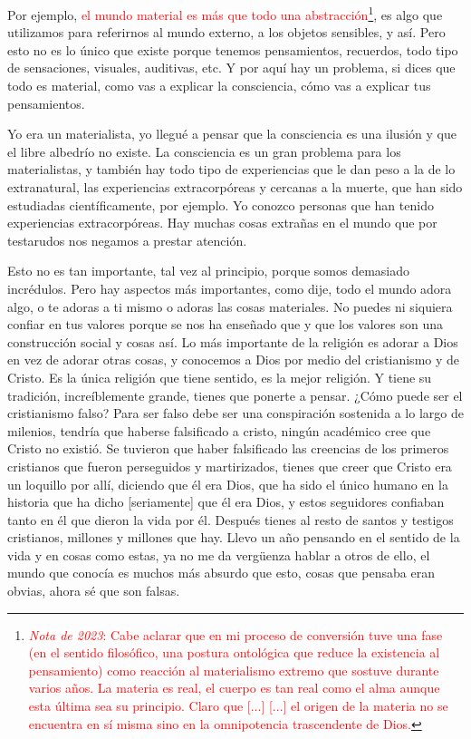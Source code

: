 \documentclass[12pt]{article}
\begin{document}
	Por ejemplo, \textcolor{red}{el mundo material es más que todo una
	abstracción}\footnote{\textcolor{red}{\textit{Nota de 2023}: Cabe
	aclarar que en mi proceso de conversión tuve una fase
	 (en el sentido filosófico, una postura ontológica
	que reduce la existencia al pensamiento)
	como reacción al materialismo extremo que sostuve durante varios años.
	La materia es real, el cuerpo es tan real como el alma aunque esta
	última sea su principio. Claro que [...]\newline} \textcolor{red}{[...]
	el origen de la materia no se encuentra en sí misma sino en la
	omnipotencia trascendente de Dios.}}, es
	algo que utilizamos para referirnos al mundo externo, a los objetos
	sensibles, y así. Pero esto no es lo único que existe porque tenemos
	pensamientos, recuerdos, todo tipo de sensaciones, visuales, auditivas,
	etc. Y por aquí hay un problema, si dices que todo es material, como vas
	a explicar la consciencia, cómo vas a explicar tus pensamientos.

	Yo era un materialista, yo llegué a pensar que la consciencia es una
	ilusión y que el libre albedrío no existe. La consciencia es un gran
	problema para los materialistas, y también hay todo tipo de experiencias
	que le dan peso a la  de lo extranatural, las
	experiencias extracorpóreas y cercanas a la muerte, que han sido
	estudiadas científicamente, por ejemplo. Yo conozco personas que han
	tenido experiencias extracorpóreas. Hay muchas cosas extrañas en el
	mundo que por testarudos nos negamos a prestar atención.

	Esto no es tan importante, tal vez al principio, porque somos
	demasiado incrédulos. Pero hay aspectos más importantes, como dije, todo
	el mundo adora algo, o te adoras a ti mismo o adoras las cosas
	materiales. No puedes ni siquiera confiar en tus valores porque se nos
	ha enseñado que  y que los valores son una
	construcción social y cosas así. Lo más importante de la religión es
	adorar a Dios en vez de adorar otras cosas, y conocemos a Dios por medio
	del cristianismo y de Cristo. Es la única religión que tiene sentido, es
	la mejor religión. Y tiene su tradición, increíblemente grande, tienes
	que ponerte a pensar. ¿Cómo puede ser el cristianismo falso? Para ser
	falso debe ser una conspiración sostenida a lo largo de milenios,
	tendría que haberse falsificado a cristo, ningún académico cree que
	Cristo no existió. Se tuvieron que haber falsificado las creencias de
	los primeros cristianos que fueron perseguidos y martirizados, tienes
	que creer que Cristo era un loquillo por allí, diciendo que él era Dios,
	que ha sido el único humano en la historia que ha dicho [seriamente] que
	él era Dios, y estos seguidores confiaban tanto en él que dieron la vida
	por él. Después tienes al resto de santos y testigos cristianos,
	millones y millones que hay. Llevo un año pensando en el sentido de la
	vida y en cosas como estas, ya no me da vergüenza hablar a otros de
	ello, el mundo que conocía es muchos más absurdo que esto, cosas que
	pensaba eran obvias, ahora sé que son falsas.
\end{document}

